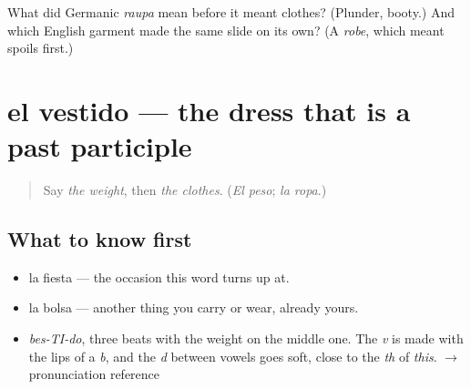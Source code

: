 \begin{tcolorbox}[breakable,colback=teal!4,colframe=teal!35!black,title={Before you move on}]
What did Germanic \emph{raupa} mean before it meant clothes? (Plunder, booty.) And which English garment made the same slide on its own? (A \emph{robe}, which meant spoils first.)
\end{tcolorbox}
\section[el vestido]{el vestido — the dress that is a past participle}

\label{lesson:ES-C360-vestido}



\begin{quote}
Say \emph{the weight}, then \emph{the clothes}. (\emph{El peso}; \emph{la ropa}.)
\end{quote}

\subsection*{What to know first}
\begin{itemize}
\raggedright
  \item la fiesta — the occasion this word turns up at.
  \item la bolsa — another thing you carry or wear, already yours.
\end{itemize}

\begin{sounds}
\begin{itemize}
\raggedright
  \item \emph{bes-TI-do}, three beats with the weight on the middle one. The \emph{v} is made with the lips of a \emph{b}, and the \emph{d} between vowels goes soft, close to the \emph{th} of \emph{this}. $\to$ pronunciation reference
\end{itemize}
\end{sounds}

